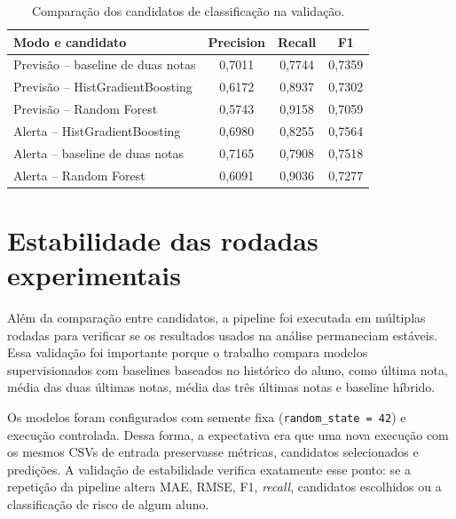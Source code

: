 \begin{table}[ht]
\caption{Compara\c{c}\~ao dos candidatos de classifica\c{c}\~ao na valida\c{c}\~ao.}
\label{tab:validacao-classificacao}
\centering
\footnotesize
\begin{tabular}{l c c c}
\hline
\textbf{Modo e candidato} & \textbf{Precision} & \textbf{Recall} & \textbf{F1} \\
\hline
Previs\~ao -- baseline de duas notas & 0,7011 & 0,7744 & 0,7359 \\
Previs\~ao -- HistGradientBoosting & 0,6172 & 0,8937 & 0,7302 \\
Previs\~ao -- Random Forest & 0,5743 & 0,9158 & 0,7059 \\
Alerta -- HistGradientBoosting & 0,6980 & 0,8255 & 0,7564 \\
Alerta -- baseline de duas notas & 0,7165 & 0,7908 & 0,7518 \\
Alerta -- Random Forest & 0,6091 & 0,9036 & 0,7277 \\
\hline
\end{tabular}
\par\smallskip{}\par
\end{table}

\section{Estabilidade das rodadas experimentais}
\label{sec:estabilidade-rodadas}

Al\'em da compara\c{c}\~ao entre candidatos, a pipeline foi executada em m\'ultiplas rodadas para verificar se os resultados usados na an\'alise permaneciam est\'aveis. Essa valida\c{c}\~ao foi importante porque o trabalho compara modelos supervisionados com baselines baseados no hist\'orico do aluno, como \'ultima nota, m\'edia das duas \'ultimas notas, m\'edia das tr\^es \'ultimas notas e baseline h\'ibrido.

Os modelos foram configurados com semente fixa (\texttt{random\_state = 42}) e execu\c{c}\~ao controlada. Dessa forma, a expectativa era que uma nova execu\c{c}\~ao com os mesmos CSVs de entrada preservasse m\'etricas, candidatos selecionados e predi\c{c}\~oes. A valida\c{c}\~ao de estabilidade verifica exatamente esse ponto: se a repeti\c{c}\~ao da pipeline altera MAE, RMSE, F1, \textit{recall}, candidatos escolhidos ou a classifica\c{c}\~ao de risco de algum aluno.

